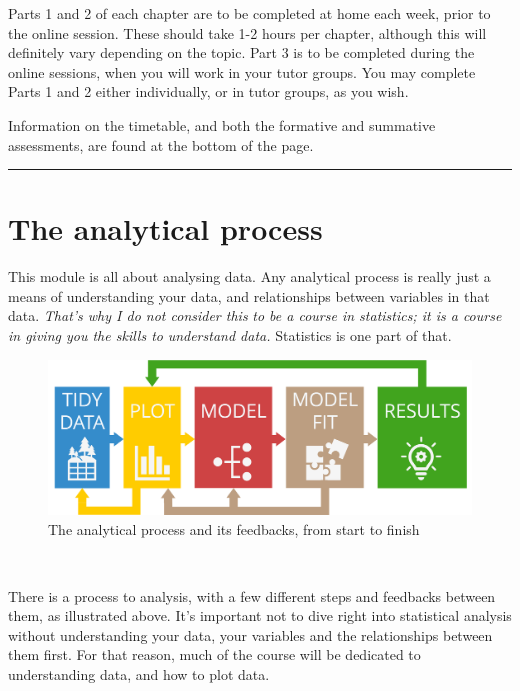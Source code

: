 \documentclass[
]{book}
\begin{document}
Parts 1 and 2 of each chapter are to be completed at home each week, prior to the
online session. These should take 1-2 hours per chapter, although this will
definitely vary depending on the topic. Part 3 is to be
completed during the online sessions, when you will work in your tutor groups.
You may complete Parts 1 and 2 either individually, or in tutor groups, as you wish.

Information on the timetable, and both the formative and summative assessments,
are found at the bottom of the page.\\
\hspace*{0.333em}

\begin{center}\rule{0.5\linewidth}{0.5pt}\end{center}

\hypertarget{the-analytical-process}{%
\section{The analytical process}\label{the-analytical-process}}

This module is all about analysing data.
Any analytical process is really just a means of understanding your data, and
relationships between variables in that data. \emph{That's why I do not consider this}
\emph{to be a course in statistics; it is a course in giving you the skills to}
\emph{understand data.} Statistics is one part of that.\\
\hspace*{0.333em}

\begin{figure}
\centering
\includegraphics{Process.png}
\caption{The analytical process and its feedbacks, from start to finish}
\end{figure}

~

There is a process to analysis, with a few different steps and feedbacks between
them, as illustrated above. It's important not to dive right into statistical
analysis without understanding your data, your variables and the relationships
between them first. For that reason, much of the course will be dedicated to
understanding data, and how to plot data.
\end{document}
